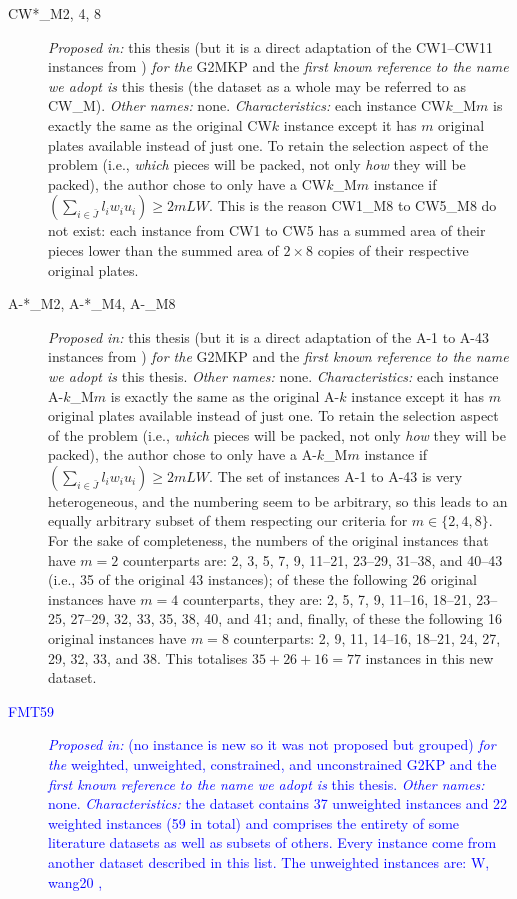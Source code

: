 \documentclass[ppgc,tese,english,formais,babel]{iiufrgs}
\newif\iffinalversion
\newcommand{\newtext}[1]{\iffinalversion%
#1%
\else%
\textcolor{blue}{#1}%
\fi%
}
\begin{document}
\begin{description}
\item [CW*\_M{2, 4, 8}] \emph{Proposed in:} this thesis (but it is a direct adaptation of the CW1--CW11 instances from \citet{fayard:1998}) \emph{for the} G2MKP and the \emph{first known reference to the name we adopt is} this thesis (the dataset as a whole may be referred to as CW\_M). \emph{Other names:} none. \emph{Characteristics:} each instance CW\(k\)\_M\(m\) is exactly the same as the original CW\(k\) instance except it has \(m\) original plates available instead of just one. To retain the selection aspect of the problem (i.e., \emph{which} pieces will be packed, not only \emph{how} they will be packed), the author chose to only have a CW\(k\)\_M\(m\) instance if \((\sum_{i \in \bar{J}} l_i w_i u_i) \geq 2 m L W\). This is the reason CW1\_M8 to CW5\_M8 do not exist: each instance from CW1 to CW5 has a summed area of their pieces lower than the summed area of \(2 \times 8\) copies of their respective original plates.
\item [A-*\_M2, A-*\_M4, A-\_M8] \emph{Proposed in:} this thesis (but it is a direct adaptation of the A-1 to A-43 instances from \citet{macedo:2010}) \emph{for the} G2MKP and the \emph{first known reference to the name we adopt is} this thesis. \emph{Other names:} none. \emph{Characteristics:} each instance A-\(k\)\_M\(m\) is exactly the same as the original A-\(k\) instance except it has \(m\) original plates available instead of just one. To retain the selection aspect of the problem (i.e., \emph{which} pieces will be packed, not only \emph{how} they will be packed), the author chose to only have a A-\(k\)\_M\(m\) instance if \((\sum_{i \in \bar{J}} l_i w_i u_i) \geq 2 m L W\). The set of instances A-1 to A-43 is very heterogeneous, and the numbering seem to be arbitrary, so this leads to an equally arbitrary subset of them respecting our criteria for \(m \in \{2, 4, 8\}\). For the sake of completeness, the numbers of the original instances that have \(m = 2\) counterparts are: 2, 3, 5, 7, 9, 11--21, 23--29, 31--38, and 40--43 (i.e., 35 of the original 43 instances); of these the following 26 original instances have \(m = 4\) counterparts, they are: 2, 5, 7, 9, 11--16, 18--21, 23--25, 27--29, 32, 33, 35, 38, 40, and 41; and, finally, of these the following 16 original instances have \(m = 8\) counterparts: 2, 9, 11, 14--16, 18--21, 24, 27, 29, 32, 33, and 38. This totalises \(35 + 26 + 16 = 77\) instances in this new dataset.
\item [\newtext{FMT59}] \newtext{\emph{Proposed in:} \citet{furini:2016} (no instance is new so it was not proposed but grouped) \emph{for the} weighted, unweighted, constrained, and unconstrained G2KP and the \emph{first known reference to the name we adopt is} this thesis. \emph{Other names:} none. \emph{Characteristics:} the dataset contains 37 unweighted instances and 22 weighted instances (59 in total) and comprises the entirety of some literature datasets as well as subsets of others. Every instance come from another dataset described in this list. The unweighted instances are: W, wang20 \citep{wang:1983},
}
\end{description}
\end{document}
